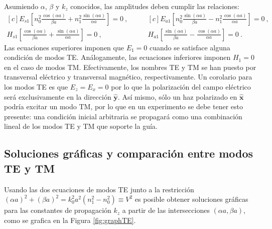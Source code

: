 Asumiendo $\alpha$, $\beta$ y $k_z$ conocidos, las amplitudes deben cumplir las relaciones:
\begin{equation*}
	\begin{aligned}[c]
	E_{s1} \left[n_0^2 \frac{\cos(\alpha a)}{\beta a}+n_1 ^2 \frac{\sin(\alpha a)}{\alpha a}\right] = 0 \ ,
		\\
	H_{s1} \left[\frac{\cos(\alpha a)}{\beta a} + \frac{\sin(\alpha a)}{\alpha a} \right] = 0 \ ,
\end{aligned} 
\quad\quad
	\begin{aligned}[c]
	E_{a1} \left[ n_0^2\frac{\sin(\alpha a)}{\beta a} - n_1^2\frac{\cos(\alpha a)}{\alpha a}\right] = 0 \ ,
		\\
	H_{a1} \left[ \frac{\sin(\alpha a)}{\beta a} - \frac{\cos(\alpha a)}{\alpha a}\right] = 0 \ .
\end{aligned} 
\end{equation*}
Las ecuaciones superiores imponen que $E_1 = 0$ cuando se satisface alguna condición de modos TE. Análogamente, las ecuaciones inferiores imponen $H_1 = 0$ en el caso de modos TM. Efectivamente, los nombres TE y TM se han puesto por transversal eléctrico y transversal magnético, respectivamente.
Un corolario para los modos TE es que $E_z = E_x = 0$ por lo que la polarización del campo eléctrico será exclusivamente en la dirección $\hat{\textbf{y}}$. Así mismo, sólo un haz polarizado en $\hat{\textbf{x}}$ podría excitar un modo TM, por lo que en un experimento se debe tener esto presente: una condición inicial arbitraria se propagará como una combinación lineal de los modos TE y TM que soporte la guía.

\subsection{Soluciones gráficas y comparación entre modos TE y TM \label{cap:solslabTETM}}

Usando las dos ecuaciones de modos TE junto a la restricción $(\alpha a)^2 + (\beta a)^2 = k_0^2 a^2(n_1^2 - n_0^2) \equiv V^2$ es posible obtener soluciones gráficas para las constantes de propagación $k_z$ a partir de las intersecciones $(\alpha a, \beta a)$, como se grafica en la Figura \ref{fig:graphTE}. 

